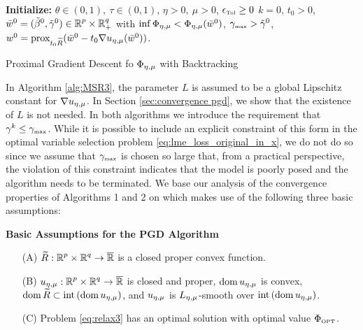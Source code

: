\begin{algorithm}[H]
\SetAlgoLined
{\bf Initialize:} 
$\theta\in(0,1),\ \tau\in(0,1)$,
$\eta>0,\ \mu>0$, $\epsilon_{\mbox{\tiny Tol}}\ge 0$
$k=0$, $t_0>0$, ${\bar w}^{0}=(\tilde\beta^0,{\tilde{\gamma}}^0)\in {\operatorname{\mathbb{R}}^p}\times\operatorname{\mathbb{R}}^q_+$
with $\inf\Phi_{\eta,\mu} <\Phi_{\eta,\mu}({\bar w}^0)$, 
${\gamma_{\mbox{\tiny max}}}>{\tilde{\gamma}}^0$, 
$w^0={\mathrm{prox}}_{t_0{\widetilde R}}({\bar w}^{0}-t_0\nabla u_{\eta,\mu}({\bar w}^0))$.
\\
\smallskip
\caption{\label{alg:pgd with bt}Proximal Gradient Descent 
fo $\Phi_{\eta,\mu}$ with Backtracking}
\end{algorithm}
\medskip


In Algorithm \ref{alg:MSR3}, 
the parameter $L$ is assumed to be a global Lipschitz
constant for $\nabla {u_{\eta,\mu}}$. In Section \ref{sec:convergence pgd}, we show that the existence of $L$ is not needed.
In both algorithms we introduce the requirement that $\gamma^k\le{\gamma_{\mbox{\tiny max}}}$.
While it is possible to include an explicit constraint of this form in the 
optimal variable selection problem \eqref{eq:lme_loss_original_in_x}, 
we do not do so since we assume that ${\gamma_{\mbox{\tiny max}}}$ is chosen 
so large that, from a practical perspective, 
the violation of this constraint indicates that the model is 
poorly posed and the algorithm needs to be terminated.
We base our analysis of the convergence properties of
Algorithms 1 and 2 on \cite[Theorem 10.15]{AB17} which makes use
of the following three basic assumptions:
\smallskip

\noindent
{\bf Basic Assumptions for the PGD Algorithm}
\begin{enumerate}
\item[(A)] ${\widetilde R}:{\operatorname{\mathbb{R}}^p}\times{\operatorname{\mathbb{R}}^q}\rightarrow {\overline{\operatorname{\mathbb{R}}}}$ is a closed proper convex function.
\item[(B)] ${u_{\eta,\mu}}:{\operatorname{\mathbb{R}}^p}\times{\operatorname{\mathbb{R}}^q}\rightarrow {\overline{\operatorname{\mathbb{R}}}}$ is closed and proper, 
$\operatorname{\mathrm{dom}}{{u_{\eta,\mu}}}$ is
convex, $\operatorname{\mathrm{dom}}{{\widetilde R}}\subset\mathrm{int}\left( \operatorname{\mathrm{dom}}{{u_{\eta,\mu}}}\right)$, and
${u_{\eta,\mu}}$ is $L_{\eta,\mu}$-smooth over $\mathrm{int}\left( \operatorname{\mathrm{dom}}{{u_{\eta,\mu}}}\right)$.
\item[(C)] Problem \eqref{eq:relax3} has an optimal solution with optimal 
value $\Phi_{\mbox{\tiny OPT}}$.
\end{enumerate}


